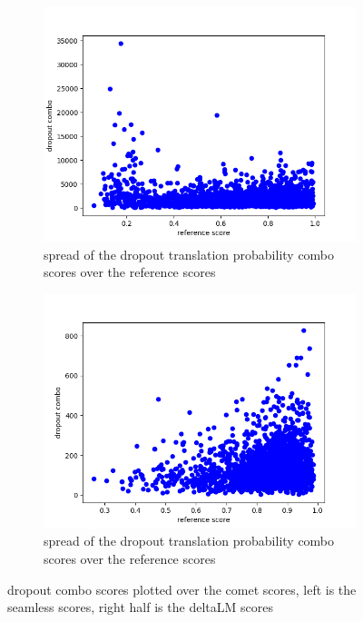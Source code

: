 \begin{figure}[ht]
        \centering%
    \begin{subfigure}{0.4\linewidth}
        \includegraphics[width=\textwidth]{Latex/sections/images/seamlessdropoutcombo.png}
        \caption{spread of the dropout translation probability combo scores over the reference scores}
    \end{subfigure}
    \begin{subfigure}{0.4\linewidth}
        \includegraphics[width=\textwidth]{Latex/sections/images/dlmdropoutcombo.png}
        \caption{spread of the dropout translation probability combo scores over the reference scores}
    \end{subfigure}
    \caption{dropout combo scores plotted over the comet scores, left is the seamless scores, right half is the deltaLM scores}
    \label{fig:dropout translation combo}
\end{figure}

